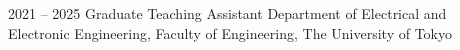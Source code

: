 

\begin{cvskills}

  \cvskill
    {2021 -- 2025} %
    {Graduate Teaching Assistant} %
    {Department of Electrical and Electronic Engineering, Faculty of Engineering, The University of Tokyo} %





\end{cvskills}
